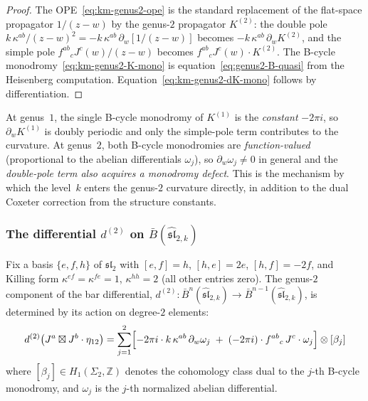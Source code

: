 \begin{proof}
The OPE~\eqref{eq:km-genus2-ope} is the standard replacement of the
flat-space propagator $1/(z-w)$ by the genus-$2$ propagator $K^{(2)}$:
the double pole $k\,\kappa^{ab}/(z-w)^2 = -k\,\kappa^{ab}\,\partial_w[1/(z-w)]$
becomes $-k\,\kappa^{ab}\,\partial_w K^{(2)}$, and the simple pole
$f^{ab}{}_c J^c(w)/(z-w)$ becomes $f^{ab}{}_c J^c(w) \cdot K^{(2)}$.
The B-cycle monodromy~\eqref{eq:km-genus2-K-mono} is
equation~\eqref{eq:genus2-B-quasi} from the Heisenberg computation.
Equation~\eqref{eq:km-genus2-dK-mono} follows by differentiation.
\end{proof}

\begin{remark}\label{rem:g1-g2-mono-contrast}
At genus~$1$, the single B-cycle monodromy of $K^{(1)}$ is the
\emph{constant} $-2\pi i$, so $\partial_w K^{(1)}$ is doubly periodic
and only the simple-pole term contributes to the curvature.  At
genus~$2$, both B-cycle monodromies are \emph{function-valued}
(proportional to the abelian differentials $\omega_j$), so
$\partial_w\omega_j \neq 0$ in general and the \emph{double-pole term
also acquires a monodromy defect}.  This is the mechanism by which the
level~$k$ enters the genus-$2$ curvature directly, in addition to the
dual Coxeter correction from the structure constants.
\end{remark}

\subsubsection{\texorpdfstring{The differential $d^{(2)}$ on $\bar{B}(\widehat{\mathfrak{sl}}_{2,k})$}{The differential d-two on the affine sl2 bar complex}}

\begin{theorem}\label{thm:sl2-genus2-bar-differential}
Fix a basis $\{e, f, h\}$ of $\mathfrak{sl}_2$ with
$[e,f] = h$, $[h,e] = 2e$, $[h,f] = -2f$, and Killing form
$\kappa^{ef} = \kappa^{fe} = 1$, $\kappa^{hh} = 2$
\textup{(}all other entries zero\textup{)}.
The genus-$2$ component of the bar differential,
$d^{(2)}\colon \bar{B}^n(\widehat{\mathfrak{sl}}_{2,k}) \to
\bar{B}^{n-1}(\widehat{\mathfrak{sl}}_{2,k})$, is determined by its
action on degree-$2$ elements:
\begin{equation}\label{eq:sl2-d2-formula}
d^{(2)}\bigl(J^a \boxtimes J^b \cdot \eta_{12}\bigr)
= \sum_{j=1}^{2} \Bigl[
  -2\pi i \cdot k\,\kappa^{ab}\, \partial_w\omega_j
  \;+\; (-2\pi i) \cdot f^{ab}{}_{c}\, J^c \cdot \omega_j
\Bigr] \otimes [\beta_j]
\end{equation}
where $[\beta_j] \in H_1(\Sigma_2, \mathbb{Z})$ denotes the
cohomology class dual to the $j$-th B-cycle monodromy, and
$\omega_j$ is the $j$-th normalized abelian differential.
\end{theorem}

